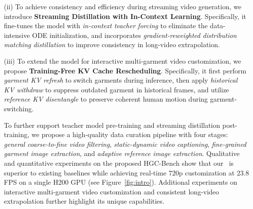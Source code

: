 (ii) To achieve consistency and efficiency during streaming video generation, we introduce \textbf{Streaming Distillation with In-Context Learning}.
Specifically, it fine-tunes the model with \textit{in-context teacher forcing} to eliminate the data-intensive ODE initialization, and incorporates \textit{gradient-reweighted distribution matching distillation} to improve consistency in long-video extrapolation.





(iii) To extend the model for interactive multi-garment video customization, we propose \textbf{Training-Free KV Cache Rescheduling}.
Specifically, it first perform \textit{garment KV refresh} to switch garments during inference, then apply \textit{historical KV withdraw} to suppress outdated garment in historical frames, and utilize \textit{reference KV disentangle} to preserve coherent human motion during garment-switching.





To further support teacher model pre-training and streaming distillation post-training, we propose a high-quality data curation pipeline with four stages: \textit{general coarse-to-fine video filtering}, \textit{static-dynamic video captioning}, \textit{fine-grained garment image extraction}, and \textit{adaptive reference image extraction}.
% 
Qualitative and quantitative experiments on the proposed HGC-Bench show that our \method\ is superior to existing baselines while achieving real-time 720p customization at 23.8 FPS on a single H200 GPU (see Figure~\ref{fig:intro}). 
Additional experiments on interactive multi-garment video customization and consistent long-video extrapolation further highlight its unique capabilities.
